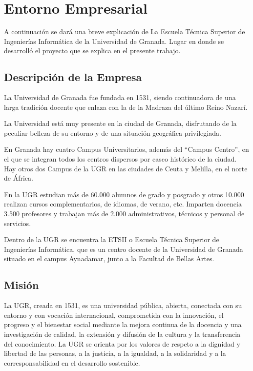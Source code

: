 \chapter{Entorno Empresarial}
\label{capituloEmpresa}

A continuación se dará una breve explicación de La Escuela Técnica Superior de Ingenierías Informática de la Universidad de Granada. Lugar en donde se desarrolló el proyecto que se explica en el presente trabajo.

\section{Descripción de la Empresa}
La Universidad de Granada fue fundada en 1531, siendo continuadora de una larga tradición docente que enlaza con la de la Madraza del último Reino Nazarí.

La Universidad está muy presente en la ciudad de Granada, disfrutando de la peculiar belleza de su entorno y de una situación geográfica privilegiada. 

En Granada hay cuatro Campus Universitarios, además del ``Campus Centro'', en el que se integran todos los centros dispersos por casco histórico de la ciudad. Hay otros dos Campus de la UGR en las ciudades de Ceuta y Melilla, en el norte de África.

En la UGR estudian más de 60.000 alumnos de grado y posgrado y otros 10.000 realizan cursos complementarios, de idiomas, de verano, etc. Imparten docencia 3.500 profesores y trabajan más de 2.000 administrativos, técnicos y personal de servicios.\cite{ugr}

Dentro de la UGR se encuentra la ETSII o Escuela Técnica Superior de Ingenierías Informática, que es un centro docente de la Universidad de Granada situado en el campus Aynadamar, junto a la Facultad de Bellas Artes.\cite{etsii}

\section{Misión}
La UGR, creada en 1531, es una universidad
pública, abierta, conectada con su
entorno y con vocación internacional,
comprometida con la innovación, el progreso
y el bienestar social mediante la
mejora continua de la docencia y una
investigación de calidad, la extensión y
difusión de la cultura y la transferencia
del conocimiento.
La UGR se orienta por los valores de
respeto a la dignidad y libertad de las
personas, a la justicia, a la igualdad, a la
solidaridad y a la corresponsabilidad en
el desarrollo sostenible.\cite{ugrMV}
